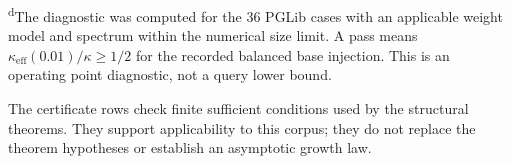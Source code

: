 \begin{table}[!t]
\begin{minipage}{0.92\linewidth}
    \smallskip
    \textsuperscript{d}The diagnostic was computed for the 36 PGLib cases with
    an applicable weight model and spectrum within the numerical size limit.
    A pass means
    $\kappa_{\mathrm{eff}}(0.01)/\kappa\geq 1/2$ for the recorded balanced base
    injection.  This is an operating point diagnostic, not a query lower bound.

    \smallskip
    The certificate rows check finite sufficient conditions used by the
    structural theorems.  They support applicability to this corpus; they do
    not replace the theorem hypotheses or establish an asymptotic growth law.
  \end{minipage}
\end{table}
